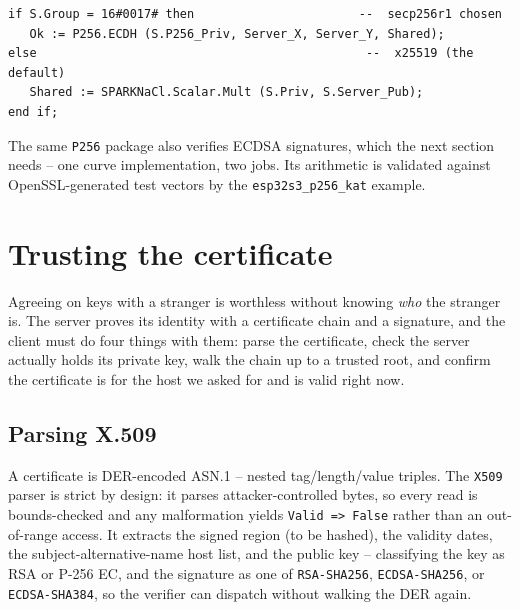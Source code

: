 \begin{lstlisting}
if S.Group = 16#0017# then                       --  secp256r1 chosen
   Ok := P256.ECDH (S.P256_Priv, Server_X, Server_Y, Shared);
else                                              --  x25519 (the default)
   Shared := SPARKNaCl.Scalar.Mult (S.Priv, S.Server_Pub);
end if;
\end{lstlisting}

The same \texttt{P256} package also verifies ECDSA signatures, which the next
section needs -- one curve implementation, two jobs. Its arithmetic is validated
against OpenSSL-generated test vectors by the \texttt{esp32s3\_p256\_kat} example.


\section{Trusting the certificate}
\label{ch:tls:certs}

Agreeing on keys with a stranger is worthless without knowing \emph{who} the
stranger is. The server proves its identity with a certificate chain and a
signature, and the client must do four things with them: parse the certificate,
check the server actually holds its private key, walk the chain up to a trusted
root, and confirm the certificate is for the host we asked for and is valid right
now.

\subsection{Parsing X.509}

A certificate is DER-encoded ASN.1 -- nested tag/length/value triples. The
\texttt{X509} parser is strict by design: it parses attacker-controlled bytes, so
every read is bounds-checked and any malformation yields \texttt{Valid => False}
rather than an out-of-range access. It extracts the signed region (to be hashed),
the validity dates, the subject-alternative-name host list, and the public key --
classifying the key as RSA or P-256 EC, and the signature as one of
\texttt{RSA-SHA256}, \texttt{ECDSA-SHA256}, or \texttt{ECDSA-SHA384}, so the
verifier can dispatch without walking the DER again.

